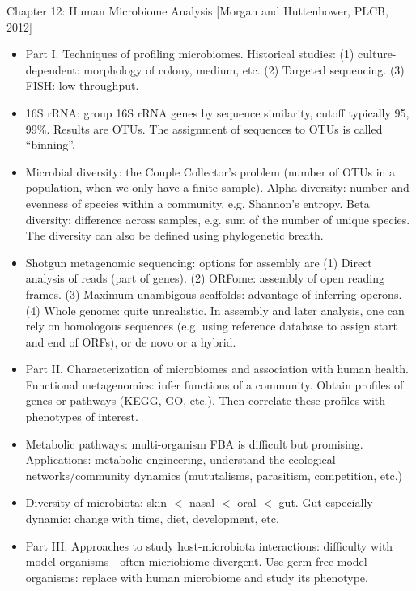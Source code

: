 \documentclass{report}
\begin{document}
Chapter 12: Human Microbiome Analysis [Morgan and Huttenhower, PLCB, 2012]
\begin{itemize}
	\item Part I. Techniques of profiling microbiomes. Historical studies: (1) culture-dependent: morphology of colony, medium, etc. (2) Targeted sequencing. (3) FISH: low throughput.
	
	\item 16S rRNA: group 16S rRNA genes by sequence similarity, cutoff typically 95, 99\%. Results are OTUs. The assignment of sequences to OTUs is called “binning”.
	
	\item Microbial diversity: the Couple Collector’s problem (number of OTUs in a population, when we only have a finite sample). Alpha-diversity: number and evenness of species within a community, e.g. Shannon’s entropy. Beta diversity: difference across samples, e.g. sum of the number of unique species. The diversity can also be defined using phylogenetic breath.
	
	\item Shotgun metagenomic sequencing: options for assembly are (1) Direct analysis of reads (part of genes). (2) ORFome: assembly of open reading frames. (3) Maximum unambigous scaffolds: advantage of inferring operons. (4) Whole genome: quite unrealistic. In assembly and later analysis, one can rely on homologous sequences (e.g. using reference database to assign start and end of ORFs), or de novo or a hybrid.
	
	\item Part II. Characterization of microbiomes and association with human health. Functional metagenomics: infer functions of a community. Obtain profiles of genes or pathways (KEGG, GO, etc.). Then correlate these profiles with phenotypes of interest.
	
	\item Metabolic pathways: multi-organism FBA is difficult but promising. Applications: metabolic engineering, understand the ecological networks/community dynamics (mututalisms, parasitism, competition, etc.)
	
	\item Diversity of microbiota: skin $<$ nasal $<$ oral $<$ gut. Gut especially dynamic: change with time, diet, development, etc.
	
	\item Part III. Approaches to study host-microbiota interactions: difficulty with model organisms - often micriobiome divergent. Use germ-free model organisms: replace with human microbiome and study its phenotype.
	

\end{itemize}
\end{document}

